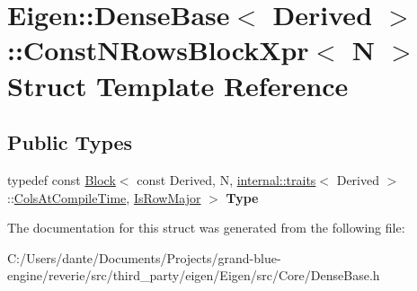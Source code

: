 \hypertarget{struct_eigen_1_1_dense_base_1_1_const_n_rows_block_xpr}{}\section{Eigen\+::Dense\+Base$<$ Derived $>$\+::Const\+N\+Rows\+Block\+Xpr$<$ N $>$ Struct Template Reference}
\label{struct_eigen_1_1_dense_base_1_1_const_n_rows_block_xpr}
\subsection*{Public Types}
\begin{DoxyCompactItemize}
\item 
\mbox{\label{struct_eigen_1_1_dense_base_1_1_const_n_rows_block_xpr_a96665a20b6e74d4beda0751074afd6fd}} 
typedef const \mbox{\hyperlink{class_eigen_1_1_block}{Block}}$<$ const Derived, N, \mbox{\hyperlink{struct_eigen_1_1internal_1_1traits}{internal\+::traits}}$<$ Derived $>$\+::\mbox{\hyperlink{class_eigen_1_1_dense_base_a86241c772c74c04eeeb0480b99c5ab77a787f85fd67ee5985917eb2cef6e70441}{Cols\+At\+Compile\+Time}}, \mbox{\hyperlink{class_eigen_1_1_dense_base_a86241c772c74c04eeeb0480b99c5ab77a406b6af91d61d348ba1c9764bdd66008}{Is\+Row\+Major}} $>$ {\bfseries Type}
\end{DoxyCompactItemize}


The documentation for this struct was generated from the following file\+:\begin{DoxyCompactItemize}
\item 
C\+:/\+Users/dante/\+Documents/\+Projects/grand-\/blue-\/engine/reverie/src/third\+\_\+party/eigen/\+Eigen/src/\+Core/Dense\+Base.\+h\end{DoxyCompactItemize}
